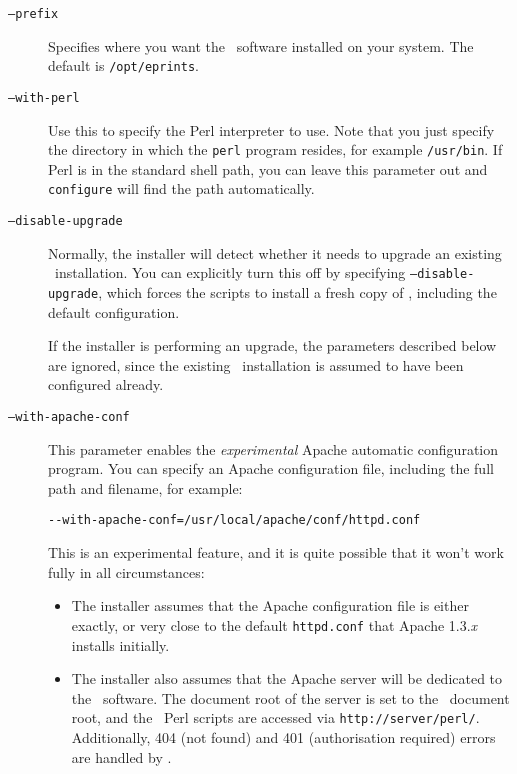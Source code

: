 \begin{description}
\item[{\tt --prefix}]

Specifies where you want the \eprints\ software installed on your system. The default is {\tt /opt/eprints}.

\item[{\tt --with-perl}]

Use this to specify the Perl interpreter to use. Note that you just specify the directory in which the {\tt perl} program resides, for example {\tt /usr/bin}. If Perl is in the standard shell path, you can leave this parameter out and {\tt configure} will find the path automatically.

\item[{\tt --disable-upgrade}]

Normally, the installer will detect whether it needs to upgrade an existing \eprints\ installation. You can explicitly turn this off by specifying {\tt --disable-upgrade}, which forces the scripts to install a fresh copy of \eprints, including the default configuration.

If the installer is performing an upgrade, the parameters described below are ignored, since the existing \eprints\ installation is assumed to have been configured already.

\item[{\tt --with-apache-conf}]

This parameter enables the \emph{experimental} Apache automatic configuration program. You can specify an Apache configuration file, including the full path and filename, for example:

\begin{verbatim}
--with-apache-conf=/usr/local/apache/conf/httpd.conf
\end{verbatim}

This is an experimental feature, and it is quite possible that it won't work fully in all circumstances:

\begin{itemize}
\item The installer assumes that the Apache configuration file is either exactly, or very close to the default {\tt httpd.conf} that Apache 1.3.\emph{x} installs initially.
\item The installer also assumes that the Apache server will be dedicated to the \eprints\ software. The document root of the server is set to the \eprints\ document root, and the \eprints\ Perl scripts are accessed via {\tt http://server/perl/}. Additionally, 404 (not found) and 401 (authorisation required) errors are handled by \eprints.
\end{itemize}


\end{description}
